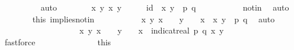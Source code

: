 \begin{isabellebody}
\ \ \ \ \ \ \ \ \isamarkupfalse%
\ auto\isanewline
\ \ \ \ \ \ \isamarkupfalse%
\ {\isachardoublequoteopen}{\isasymAnd}x\ y{\isachardot}{\kern0pt}\ {\isacharparenleft}{\kern0pt}x{\isacharcomma}{\kern0pt}\ y{\isacharparenright}{\kern0pt}\ {\isasymin}\ {\isasymK}\ {\isasymtimes}\ {\isasymK}\ {\isacharminus}{\kern0pt}\ {\isacharquery}{\kern0pt}id\ {\isasymLongrightarrow}\ {\isacharparenleft}{\kern0pt}x{\isacharcomma}{\kern0pt}\ y{\isacharparenright}{\kern0pt}\ {\isasymnoteq}\ {\isacharparenleft}{\kern0pt}p{\isacharcomma}{\kern0pt}\ q{\isacharparenright}{\kern0pt}{\isachardoublequoteclose}\ \isanewline
\ \ \ \ \ \ \ \ \isamarkupfalse%
\ not{\isacharunderscore}{\kern0pt}in\ \isamarkupfalse%
\ auto\isanewline
\ \ \ \ \ \ \isamarkupfalse%
\ this\ implies{\isacharunderscore}{\kern0pt}notin\ \isamarkupfalse%
\ \isanewline
\ \ \ \ \ \ \ \ {\isachardoublequoteopen}{\isasymAnd}x\ y{\isachardot}{\kern0pt}\ x\ {\isasymin}\ {\isasymK}\ {\isasymLongrightarrow}\ y\ {\isasymin}\ {\isasymK}\ {\isacharminus}{\kern0pt}\ {\isacharbraceleft}{\kern0pt}x{\isacharbraceright}{\kern0pt}\ {\isasymLongrightarrow}\ {\isacharparenleft}{\kern0pt}x{\isacharcomma}{\kern0pt}\ y{\isacharparenright}{\kern0pt}\ {\isasymnotin}\ {\isacharbraceleft}{\kern0pt}{\isacharparenleft}{\kern0pt}p{\isacharcomma}{\kern0pt}\ q{\isacharparenright}{\kern0pt}{\isacharbraceright}{\kern0pt}{\isachardoublequoteclose}\ \isamarkupfalse%
\ auto\isanewline
\ \ \ \ \ \ \isamarkupfalse%
\ \isamarkupfalse%
\ \ \isanewline
\ \ \ \ \ \ \ \ {\isachardoublequoteopen}{\isasymAnd}x\ y{\isachardot}{\kern0pt}\ x\ {\isasymin}\ {\isasymK}\ {\isasymLongrightarrow}\ y\ {\isasymin}\ {\isasymK}\ {\isacharminus}{\kern0pt}\ {\isacharbraceleft}{\kern0pt}x{\isacharbraceright}{\kern0pt}\ {\isasymLongrightarrow}\ indicat{\isacharunderscore}{\kern0pt}real\ {\isacharbraceleft}{\kern0pt}{\isacharparenleft}{\kern0pt}p{\isacharcomma}{\kern0pt}\ q{\isacharparenright}{\kern0pt}{\isacharbraceright}{\kern0pt}\ {\isacharparenleft}{\kern0pt}x{\isacharcomma}{\kern0pt}\ y{\isacharparenright}{\kern0pt}\ {\isacharequal}{\kern0pt}\ {}{\isachardoublequoteclose}\ \isanewline
\ \ \ \ \ \ \ \ \isamarkupfalse%
\ fastforce\isanewline
\ \ \ \ \ \ \isanewline
\ \ \ \ \ \ \isamarkupfalse%
\ this\ \isamarkupfalse%

\end{isabellebody}
